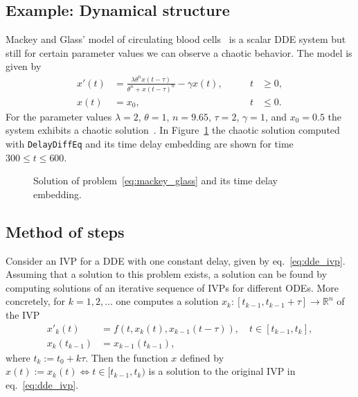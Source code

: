 \documentclass{juliacon}
\def\pkg#1{\texttt{#1}}
\begin{document}
\subsection{Example: Dynamical structure}

Mackey and Glass' model of circulating blood cells~\cite{glass79} is a scalar DDE system but
still for certain parameter values we can observe a chaotic behavior.
The model is given by
\begin{equation}\label{eq:mackey_glass}
    \begin{aligned}
        x'(t) &= \frac{\lambda \theta^{n} x(t - \tau)}{\theta^{n} + x{(t - \tau)}^n} - \gamma x(t), \qquad & t &\geq 0, \\
        x(t) &= x_{0}, \qquad & t &\leq 0.
    \end{aligned}
\end{equation}
For the parameter values $\lambda = 2$, $\theta = 1$, $n = 9.65$, $\tau = 2$, $\gamma = 1$, and $x_{0} = 0.5$ the system exhibits a chaotic solution~\cite[Figure~6(e)]{glass79}.
In Figure~\ref{fig:mackey_glass} the chaotic solution computed with \pkg{DelayDiffEq} and its time delay embedding are shown for time $300 \leq t \leq 600$.

\begin{figure}
    \centering
    
    \caption{Solution of problem~\eqref{eq:mackey_glass} and its time delay embedding.}
    \label{fig:mackey_glass}
\end{figure}

\subsection{Method of steps}

Consider an IVP for a DDE with one constant delay, given by eq.~\eqref{eq:dde_ivp}.
Assuming that a solution to this problem exists, a solution can be found by
computing solutions of an iterative sequence of IVPs for different ODEs. More
concretely, for $k = 1,2,\ldots$ one computes a solution
$x_k \colon [t_{k-1}, t_{k-1} + \tau] \to \mathbb{R}^n$ of the IVP
\begin{equation}\label{eq:ode_method_of_steps}
    \begin{aligned}
        x'_k(t) &= f(t, x_k(t), x_{k-1}(t - \tau)), \quad t \in [t_{k-1}, t_k], \\
        x_k(t_{k-1}) &= x_{k-1}(t_{k-1}),
    \end{aligned}
\end{equation}
where $t_k := t_0 + k\tau$. Then the function $x$ defined by
$x(t) := x_k(t) \Longleftrightarrow t \in [t_{k-1}, t_k)$ is a solution
to the original IVP in eq.~\eqref{eq:dde_ivp}.
\end{document}
